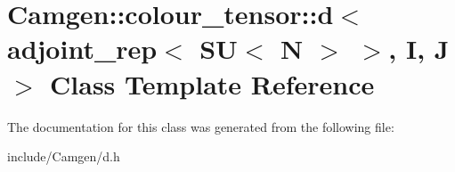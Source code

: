 \hypertarget{a00113}{}\section{Camgen\+:\+:colour\+\_\+tensor\+:\+:d$<$ adjoint\+\_\+rep$<$ S\+U$<$ N $>$ $>$, I, J $>$ Class Template Reference}
\label{a00113}


The documentation for this class was generated from the following file\+:\begin{DoxyCompactItemize}
\item 
include/\+Camgen/d.\+h\end{DoxyCompactItemize}
